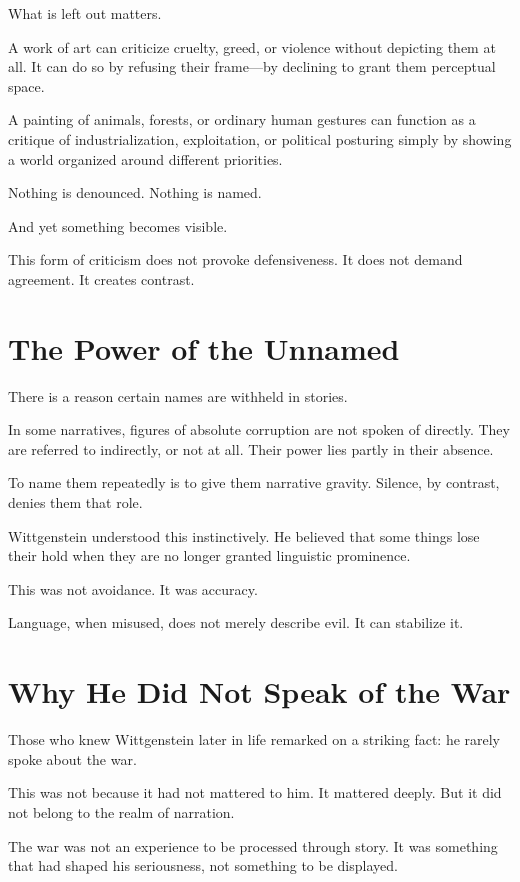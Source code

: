 \documentclass[11pt]{article}
\begin{document}
What is left out matters.

A work of art can criticize cruelty, greed, or violence without depicting them at all. It can do so by refusing their frame—by declining to grant them perceptual space.

A painting of animals, forests, or ordinary human gestures can function as a critique of industrialization, exploitation, or political posturing simply by showing a world organized around different priorities.

Nothing is denounced. Nothing is named.

And yet something becomes visible.

This form of criticism does not provoke defensiveness. It does not demand agreement. It creates contrast.

\section*{The Power of the Unnamed}

There is a reason certain names are withheld in stories.

In some narratives, figures of absolute corruption are not spoken of directly. They are referred to indirectly, or not at all. Their power lies partly in their absence.

To name them repeatedly is to give them narrative gravity. Silence, by contrast, denies them that role.

Wittgenstein understood this instinctively. He believed that some things lose their hold when they are no longer granted linguistic prominence.

This was not avoidance. It was accuracy.

Language, when misused, does not merely describe evil. It can stabilize it.

\section*{Why He Did Not Speak of the War}

Those who knew Wittgenstein later in life remarked on a striking fact: he rarely spoke about the war.

This was not because it had not mattered to him. It mattered deeply. But it did not belong to the realm of narration.

The war was not an experience to be processed through story. It was something that had shaped his seriousness, not something to be displayed.
\end{document}
